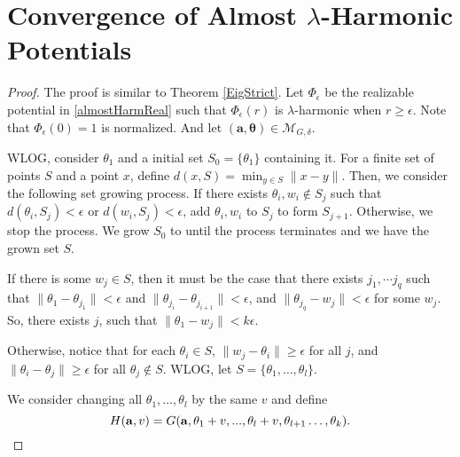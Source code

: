 

\section{Convergence of Almost $\lambda$-Harmonic Potentials}\label{App:EigenFunc}

\AlmostHarmConv*

\begin{proof}
 The proof is similar to Theorem \ref{EigStrict}. Let $\Phi_\epsilon$ be the realizable potential in \ref{almostHarmReal} such that $\Phi_\epsilon(r)$ is $\lambda$-harmonic when $r \geq \epsilon$. Note that $\Phi_\epsilon(0) = 1$ is normalized. And let $\boldsymbol{(a,\theta)} \in \mathcal{M}_{G,\delta}$. 
 
WLOG, consider $\theta_1$ and a initial set $S_0 = \{ \theta_1\}$ containing it. For a finite set of points $S$ and a point $x$, define $d(x,S) = \min_{y \in S} \| x - y\|$. Then, we consider the following set growing process. If there exists $\theta_i, w_i \not \in S_j$ such that $d(\theta_i, S_j) < \epsilon$ or $d(w_i, S_j) < \epsilon$, add $\theta_i, w_i$ to $S_j$ to form $S_{j+1}$. Otherwise, we stop the process. We grow $S_0$ to until the process terminates and we have the grown set $S$.

If there is some $w_j \in S$, then it must be the case that there exists ${j_1},\cdots {j_q}$ such that $\|\theta_1 - \theta_{j_1} \| < \epsilon$ and
$\|\theta_{j_{i}} - \theta_{j_{i+1}}\| < \epsilon$, and
$\|\theta_{j_q}- w_j\| <\epsilon$ for some $w_j$. So, there exists $j$, such that $\|\theta_1 - w_j\| < k\epsilon$. 

Otherwise, notice that for each $\theta_i \in S$, $\|w_j - \theta_i\|\geq \epsilon$ for all $j$, and $\|\theta_i - \theta_j\| \geq \epsilon$ for all $\theta_j\not \in S$. WLOG, let $S = \{\theta_1,\dots,\theta_l\}$. 
  
We consider changing all
$\theta_1, \ldots, \theta_{l}$ by the same $v$ and define 
%
\[H({\bf a}, v) = G({\bf a},\theta_1+v,...,\theta_l+v, \theta_{l+1}
\ldots, \theta_k).\]


\end{proof}
